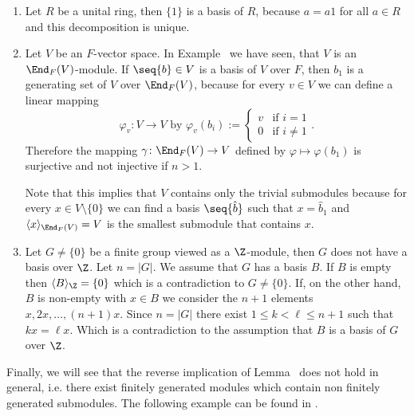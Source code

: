 \begin{exam}\label{exam.Bases of Modules}
\begin{enumerate}
\item Let $R$ be a unital ring, then $\lbrace 1\rbrace$ is a basis of $R$, because $a=a1$ for all $a\in R$ and this decomposition is unique.
\item Let $V$ be an $F$-vector space. In Example~ we have seen, that $V$ is an $\End_F(V)$-module. If $\seq{b}\in V$ is a basis of $V$ over $F$, then $b_1$ is a generating set of $V$ over $\End_F(V)$, because for every $v\in V$ we can define a linear mapping 
\begin{equation*}
\varphi_v\colon V\to V \text{ by } \varphi_v(b_i):= \begin{cases}v & \text{if } i=1\\ 0 & \text{if } i\neq 1\end{cases}.
\end{equation*}
Therefore the mapping $\gamma\colon \End_F(V)\to V$ defined by $\varphi\mapsto \varphi(b_1)$ is surjective and not injective if $n>1$.

Note that this implies that $V$ contains only the trivial submodules because for every $x\in V\setminus\lbrace 0\rbrace$ we can find a basis $\seq{\hat{b}}$ such that $x=\hat{b}_1$ and $\langle x\rangle_{\End_F(V)}=V$ is the smallest submodule that contains $x$. \label{exam. Generating set of V over EndFV}
\item Let $G\neq\lbrace 0\rbrace$ be a finite group viewed as a $\Z$-module, then $G$ does not have a basis over $\Z$. Let $n=|G|$. We assume that $G$ has a basis $B$. If $B$ is empty then $\langle B\rangle_{\Z} =\lbrace 0\rbrace$ which is a contradiction to $G\neq\lbrace 0\rbrace$. If, on the other hand, $B$ is non-empty with $x\in B$ we consider the $n+1$ elements $x,2x,\ldots,(n+1)x$. Since $n=| G|$ there exist $1\leq k<\ell\leq n+1$ such that $kx=\ell x$. Which is a contradiction to the assumption that $B$ is a basis of $G$ over $\Z$.\label{exam.basis of G}
\end{enumerate}
\end{exam}

Finally, we will see that the reverse implication of Lemma~ does not hold in general, i.e. there exist finitely generated modules which contain non finitely generated submodules. The following example can be found in \cite[p.197]{jantzen2005algebra}.

